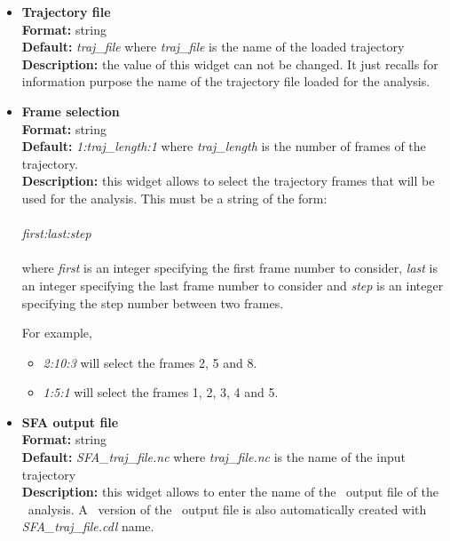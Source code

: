 \documentclass[a4paper,11pt]{report}
\begin{document}
\begin{itemize}
\item \textbf{Trajectory file}\\
\textbf{Format:} string\\
\textbf{Default:} \textit{traj\_file} where \textit{traj\_file} is the name of the loaded trajectory\\
\textbf{Description:} the value of this widget can not be changed. It just recalls for information purpose the name
of the trajectory file loaded for the analysis.

\item \textbf{Frame selection}\\
\textbf{Format:} string\\
\textbf{Default:} \textit{1:traj\_length:1} where \textit{traj\_length} is the number of frames of the trajectory.\\
\textbf{Description:} this widget allows to select the trajectory frames that will be used for the analysis. This must
be a string of the form:
\\\\
\textit{first:last:step}
\\\\
where \textit{first} is an integer specifying the first frame number to consider, \textit{last} is an integer specifying the last 
frame number to consider and \textit{step} is an integer specifying the step number between two frames.

For example,
\begin{itemize}
\item \textit{2:10:3} will select the frames 2, 5 and 8.
\item \textit{1:5:1} will select the frames 1, 2, 3, 4 and 5.
\end{itemize}

\item \textbf{SFA output file}\\
\textbf{Format:} string\\
\textbf{Default:} \textit{SFA\_traj\_file.nc} where \textit{traj\_file.nc} is the name of the input trajectory\\
\textbf{Description:} this widget allows to enter the name of the \NetCDF\ output file of the \SFA\ analysis. A \CDL\ 
version of the \NetCDF\ output file is also automatically created with \textit{SFA\_traj\_file.cdl} name.
\end{itemize}
\end{document}
